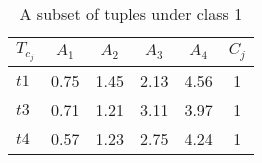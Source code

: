 \begin{table}[h]
\caption{A subset of tuples under class 1}
\label{table:table2_2}
\centering
\begin{tabular}{lccccc}
	\toprule
	\textbf{$\mathit{T_{c_j}}$} & \textbf{$\mathit{A_1}$} & \textbf{$\mathit{A_2}$} & \textbf{$\mathit{A_3}$} & \textbf{$\mathit{A_4}$} & \textbf{$\mathit{C_j}$} \\
	\midrule
	$\mathit{t1}$ & 0.75 & 1.45 & 2.13 & 4.56 & 1 \\
	$\mathit{t3}$ & 0.71 & 1.21 & 3.11 & 3.97 & 1 \\
	$\mathit{t4}$ & 0.57 & 1.23 & 2.75 & 4.24 & 1 \\
	\bottomrule
\end{tabular} 
\end{table}

